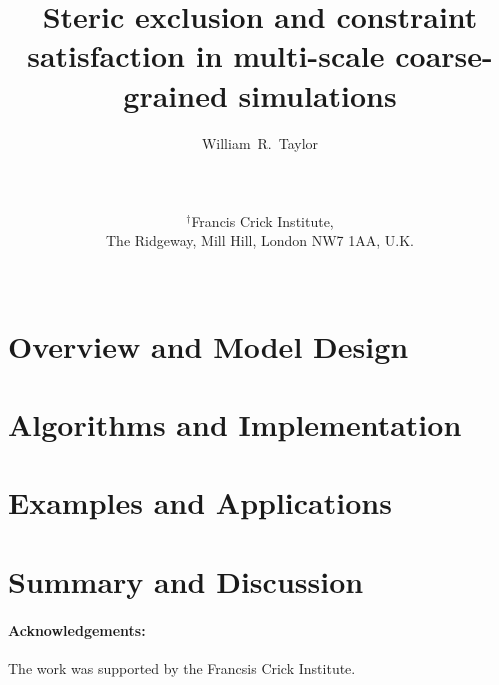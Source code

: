 \documentclass[12pt]{article}
\begin{document}
\title{\bf Steric exclusion and constraint satisfaction in multi-scale coarse-grained simulations
}

\author{
William~R.~Taylor\\ \\ \\ \\
$^\dagger$Francis Crick Institute,\\
The Ridgeway, Mill Hill, London NW7 1AA, U.K.\\ \\ 
}
\begin{singlespace}
\maketitle
\end{singlespace}
\clearpage
%
\section{Overview and Model Design}

\clearpage
\section{Algorithms and Implementation}

\clearpage

\clearpage
\section{Examples and Applications}


\clearpage
\section{Summary and Discussion}

\clearpage
\begin{singlespace}


\paragraph{Acknowledgements:}
The work was supported by the Francsis Crick Institute.
\clearpage
%
\end{singlespace}
\end{document}
